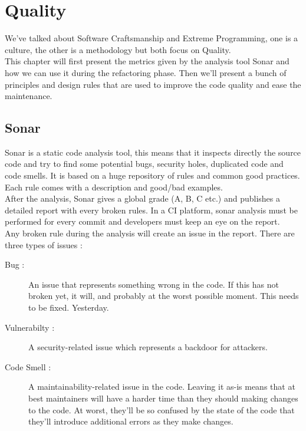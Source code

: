 \section{Quality}\label{sec:quality}
We've talked about Software Craftsmanship and Extreme Programming,
one is a culture, the other is a methodology but both focus on Quality.
\\
This chapter will first present the metrics given by the analysis
tool Sonar and how we can use it during the refactoring phase.
Then we'll present a bunch of principles and design rules that
are used to improve the code quality and ease the maintenance.

\subsection{Sonar}\label{subsec:sonar}
Sonar is a static code analysis tool, this means that it inspects
directly the source code and try to find some potential bugs, security
holes, duplicated code and code smells.
It is based on a huge repository of rules and common good practices.
Each rule comes with a description and good/bad examples. \\
After the analysis, Sonar gives a global grade (A, B, C etc.) and
publishes a detailed report with every broken rules.
In a CI platform, sonar analysis must be performed for every commit and
developers must keep an eye on the report. \\
\newline
Any broken rule during the analysis will create an issue in the report.
There are three types of issues :

\begin{description}
    \item[Bug :]
    An issue that represents something wrong in the code.
    If this has not broken yet, it will, and probably at the worst
    possible moment.
    This needs to be fixed.
    Yesterday.
    \item[Vulnerabilty :]
    A security-related issue which represents a backdoor for attackers.
    \item[Code Smell :]
    A maintainability-related issue in the code.
    Leaving it as-is means that at best maintainers will have a harder
    time than they should making changes to the code.
    At worst, they'll be so confused by the state of the code that
    they'll introduce additional errors as they make changes.
\end{description}

